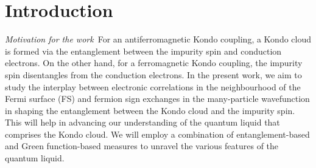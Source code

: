 \documentclass[aps,prb,preprint,groupedaddress]{revtex4-2}
\begin{document}
\section{Introduction}
\par\noindent
\emph{Motivation for the work}~For an antiferromagnetic Kondo coupling, a Kondo cloud is formed via the entanglement between the impurity spin and conduction electrons. On the other hand, for a ferromagnetic Kondo coupling, the impurity spin disentangles from the conduction electrons. In the present work, we aim to study the interplay between electronic correlations in the neighbourhood of the Fermi surface (FS) and fermion sign exchanges in the many-particle wavefunction in shaping the entanglement between the Kondo cloud and the impurity spin. This will help in advancing our understanding of the quantum liquid that comprises the Kondo cloud. We will employ a  combination of entanglement-based and Green function-based measures to unravel the various features of the quantum liquid.
\end{document}
